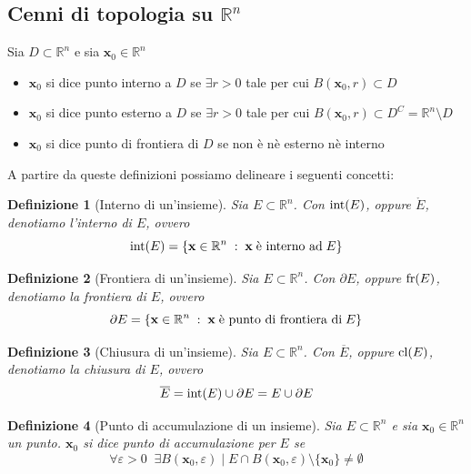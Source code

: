 \documentclass{article}
\newtheorem{definition}{Definizione}
\begin{document}
    \subsection{Cenni di topologia su $\mathbb{R}^{n}$}
        Sia $D \subset \mathbb{R}^{n}$ e sia $\mathbf{x}_0 \in \mathbb{R}^{n}$
        \begin{itemize}
            \item $\mathbf{x}_0$ si dice punto interno a $D$ se $\exists r > 0$ tale per cui $B(\mathbf{x}_0, r) \subset D$
            \item $\mathbf{x}_0$ si dice punto esterno a $D$ se $\exists r > 0$ tale per cui $B(\mathbf{x}_0, r) \subset D^{C} = \mathbb{R}^{n} \setminus D$
            \item $\mathbf{x}_0$ si dice punto di frontiera di $D$ se non è nè esterno nè interno 
        \end{itemize}
        
        A partire da queste definizioni possiamo delineare i seguenti concetti: 
        \begin{definition} [Interno di un'insieme]
            Sia $E \subset \mathbb{R}^{n}$. Con $\textnormal{int}(E)$, oppure $\mathring{E}$, denotiamo l'interno di $E$, ovvero
            \[
                \textnormal{int}(E) = \{ \mathbf{x} \in \mathbb{R}^{n} \; : \; \mathbf{x} \; \textnormal{è interno ad} \; E \}
            \]
        \end{definition}

        \begin{definition} [Frontiera di un'insieme]
            Sia $E \subset \mathbb{R}^{n}$. Con $\partial E$, oppure $\textnormal{fr}(E)$, denotiamo la frontiera di $E$, ovvero
            \[
                \partial E = \{ \mathbf{x} \in \mathbb{R}^{n} \; : \; \mathbf{x} \; \textnormal{è punto di frontiera di} \; E \}
            \]
        \end{definition}

        \begin{definition} [Chiusura di un'insieme]
            Sia $E \subset \mathbb{R}^{n}$. Con $\overline{E}$, oppure $\textnormal{cl}(E)$, denotiamo la chiusura di $E$, ovvero
            \[
                \overline E = \textnormal{int}(E) \cup \partial E = E \cup \partial E
            \]
        \end{definition}

        \begin{definition} [Punto di accumulazione di un insieme]
            Sia $E \subset \mathbb{R}^{n}$ e sia $\mathbf{x}_0 \in \mathbb{R}^{n}$ un punto. $\mathbf{x}_0$ si dice punto di accumulazione per $E$ se
            \[
                \forall \varepsilon > 0 \;\; \exists B(\mathbf{x}_0, \varepsilon) \; | \; E \cap B(\mathbf{x}_0, \varepsilon) \setminus \{\mathbf{x}_0\} \neq \emptyset
            \]
        \end{definition}
\end{document}
